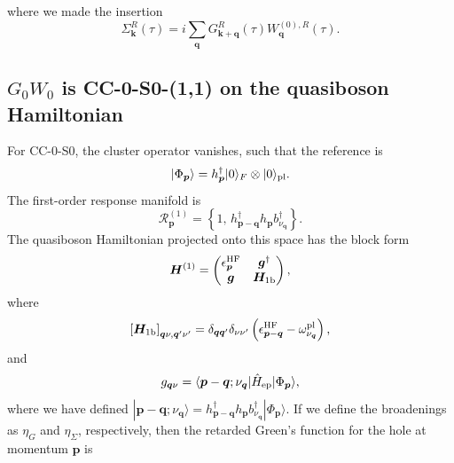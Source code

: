 where we made the insertion 
\begin{equation}
    \Sigma_{\bm{k}}^{R}(\tau)
    =
    i\sum_{\bm q}
    G_{\bm{k}+\bm q}^{R}(\tau)
    W_{\bm q}^{(0),R}(\tau).
\end{equation}
\subsection{$G_0W_0$ is CC-0-S0-(1,1) on the quasiboson Hamiltonian}

For CC-0-S0, the cluster operator vanishes,
such that the reference is
\begin{equation}
    |\Phi_{\bm p}\rangle
    =
    h_{\bm p}^{\dagger}|0\rangle_F
    \otimes |0\rangle_{\rm pl}.
\end{equation}
The first-order response manifold is
\begin{equation}
    \mathcal R_{\bm p}^{(1)}
    =
    \left\{
    1,\,
    h_{\bm p-\bm q}^{\dagger}
    h_{\bm p}
    b_{\nu_{\bm q}}^{\dagger}
    \right\}.
\end{equation}
The quasiboson Hamiltonian projected onto this space has the block form
\begin{equation}
    \bm H^{(1)}
    =
    \begin{pmatrix}
        \epsilon_{\bm p}^{\rm HF} & \bm g^{\dagger} \\
        \bm g & \bm H_{1{\rm b}}
    \end{pmatrix},
\end{equation}
where
\begin{equation}
    \left[\bm H_{1{\rm b}}\right]_{\bm q\nu,\bm q'\nu'}
    =
    \delta_{\bm q\bm q'}\delta_{\nu\nu'}
    \left(
    \epsilon_{\bm p-\bm q}^{\rm HF}
    -
    \omega_{\nu_{\bm q}}^{\rm pl}
    \right),
\end{equation}
and
\begin{equation}
    g_{\bm q\nu}
    =
    \langle
    \bm p-\bm q;\nu_{\bm q}
    |
    \hat H_{\rm ep}
    |
    \Phi_{\bm p}
    \rangle,
\end{equation}
where we have defined $
    |\bm p-\bm q;\nu_{\bm q}\rangle
    =
    h_{\bm p-\bm q}^{\dagger}
    h_{\bm p}
    b_{\nu_{\bm q}}^{\dagger}
    |\Phi_{\bm p}\rangle
$.
If we define the broadenings as $\eta_G$ and $\eta_{\Sigma}$, respectively, then the retarded Green's function for the hole at momentum $\bm p$ is
